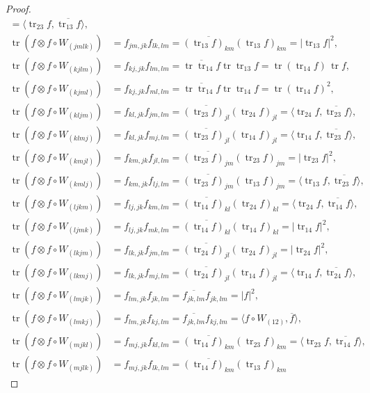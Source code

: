 \documentclass[10pt,a4paper]{amsart}
\theoremstyle{definition}
\def\ov#1{\overline{#1}}
\DeclareMathOperator{\tr}{tr}
\begin{document}
\begin{proof}
\begin{align*}
= \langle \tr_{23} f, \ov{\tr_{13} f} \rangle,
\\
\tr(f \otimes f \circ W_{(jmlk)})
&= f_{jm,jk} f_{lk,lm}
= \ov{(\tr_{13} f)_{km}} (\tr_{13} f)_{km}
= |\!\tr_{13} f|^2,
\\
\tr(f \otimes f \circ W_{(kjlm)})
&= f_{kj,jk} f_{lm,lm}
= \ov{\tr \tr_{14} f} \tr \tr_{13} f
= \tr(\tr_{14}f) \, \tr f,
\\
\tr(f \otimes f \circ W_{(kjml)})
&= f_{kj,jk} f_{ml,lm}
= \ov{\tr \tr_{14} f} \tr \tr_{14} f
= \tr(\tr_{14} f)^2,
\\
\tr(f \otimes f \circ W_{(kljm)})
&= f_{kl,jk} f_{jm,lm}
= \ov{(\tr_{23} f)_{jl}} (\tr_{24} f)_{jl}
= \langle \tr_{24} f, \ov{\tr_{23} f} \rangle,
\\
\tr(f \otimes f \circ W_{(klmj)})
&= f_{kl,jk} f_{mj,lm}
= \ov{(\tr_{23} f)_{jl}} (\tr_{14} f)_{jl}
= \langle \tr_{14} f, \ov{\tr_{23} f} \rangle,
\\
\tr(f \otimes f \circ W_{(kmjl)})
&= f_{km,jk} f_{jl,lm}
= \ov{(\tr_{23} f)_{jm}} (\tr_{23} f)_{jm}
= |\! \tr_{23} f|^2,
\\
\tr(f \otimes f \circ W_{(kmlj)})
&= f_{km,jk} f_{lj,lm}
= \ov{(\tr_{23} f)_{jm}} (\tr_{13} f)_{jm}
= \langle \tr_{13} f, \ov{\tr_{23} f} \rangle,
\\
\tr(f \otimes f \circ W_{(ljkm)})
&= f_{lj,jk} f_{km,lm}
= \ov{(\tr_{14} f)_{kl}} (\tr_{24} f)_{kl}
= \langle \tr_{24} f, \ov{\tr_{14} f} \rangle,
\\
\tr(f \otimes f \circ W_{(ljmk)})
&= f_{lj,jk} f_{mk,lm}
= \ov{(\tr_{14} f)_{kl}} (\tr_{14} f)_{kl}
= |\! \tr_{14} f|^2,
\\
\tr(f \otimes f \circ W_{(lkjm)})
&= f_{lk,jk} f_{jm,lm}
= \ov{(\tr_{24} f)_{jl}} (\tr_{24} f)_{jl}
= |\! \tr_{24} f|^2,
\\
\tr(f \otimes f \circ W_{(lkmj)})
&= f_{lk,jk} f_{mj,lm}
= \ov{(\tr_{24} f)_{jl}} (\tr_{14} f)_{jl}
= \langle \tr_{14} f, \ov{\tr_{24} f} \rangle,
\\
\tr(f \otimes f \circ W_{(lmjk)})
&= f_{lm,jk} f_{jk,lm}
= \ov{f_{jk,lm}} f_{jk,lm}
= |f|^2,
\\
\tr(f \otimes f \circ W_{(lmkj)})
&= f_{lm,jk} f_{kj,lm}
= \ov{f_{jk,lm}} f_{kj,lm}
= \langle f \circ W_{(12)}, \ov f \rangle ,
\\
\tr(f \otimes f \circ W_{(mjkl)})
&= f_{mj,jk} f_{kl,lm}
= \ov{(\tr_{14} f)_{km}} (\tr_{23} f)_{km}
= \langle \tr_{23} f, \ov{\tr_{14} f} \rangle,
\\
\tr(f \otimes f \circ W_{(mjlk)})
&= f_{mj,jk} f_{lk,lm}
= \ov{(\tr_{14} f)_{km}} (\tr_{13} f)_{km}

\end{align*}
\end{proof}
\end{document}
